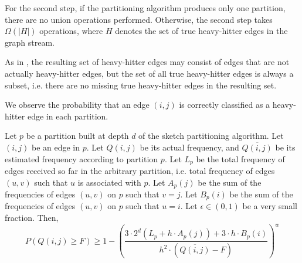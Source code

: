 For the second step, if the partitioning algorithm produces only one partition, there are no union operations performed. Otherwise, the second step takes $\Omega(|H|)$ operations, where $H$ denotes the set of true heavy-hitter edges in the graph stream.

As in \cite{khan}, the resulting set of heavy-hitter edges may consist of edges that are not actually heavy-hitter edges, but the set of all true heavy-hitter edges is always a subset, i.e. there are no missing true heavy-hitter edges in the resulting set.

We observe the probability that an edge $(i,j)$ is correctly classified as a heavy-hitter edge in each partition.

\begin{theorem}
Let $p$ be a partition built at depth $d$ of the sketch partitioning algorithm. Let $(i,j)$ be an edge in $p$. Let $Q(i,j)$ be its actual frequency, and $\overline{Q(i,j)}$ be its estimated frequency according to partition $p$. Let $L_p$ be the total frequency of edges received so far in the arbitrary partition, i.e. total frequency of edges $(u,v)$ such that $u$ is associated with $p$. Let $A_p(j)$ be the sum of the frequencies of edges $(u,v)$ on $p$ such that $v=j$. Let $B_p(i)$ be the sum of the frequencies of edges $(u,v)$ on $p$ such that $u=i$. Let $\epsilon \in (0,1)$ be a very small fraction. Then,
\[
P(Q(i,j) \geq F) \geq 1-(\frac{3\cdot2^d(L_p+h\cdot A_p(j)) + 3\cdot h\cdot B_p(i)}{h^2\cdot (\overline{Q(i,j)}-F)})^w
\]
\end{theorem}

